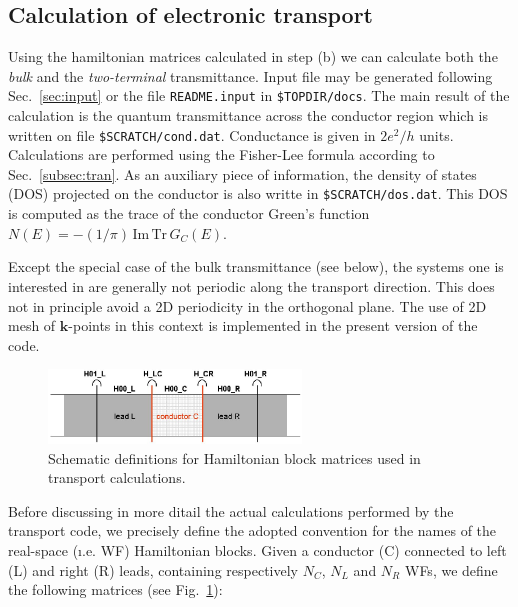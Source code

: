 
\subsection {Calculation of electronic transport}
\label{subsection:transport}

Using the hamiltonian matrices calculated in step (b) we can
calculate both the {\em bulk} and the {\em two-terminal} transmittance.
Input file may be generated following Sec.~\ref{sec:input}
or the file {\tt README.input} in {\tt \$TOPDIR/docs}. The main result of the 
calculation is the quantum transmittance across the conductor region
which is written on file {\tt \$SCRATCH/cond.dat}. Conductance is given
in $2e^2/h$ units. Calculations are performed using the Fisher-Lee formula
according to Sec.~\ref{subsec:tran}.
As an auxiliary piece of information, the density of states (DOS) projected on
the conductor is also writte in {\tt \$SCRATCH/dos.dat}.
This DOS is computed as the trace of the conductor Green's function
$ N(E) = -(1/\pi)\, \text{Im} \, \text{Tr}\, G_C(E)$.

Except the special case of the bulk transmittance (see below), the systems one is
interested in are generally not periodic along the transport direction. This does not
in principle avoid a 2D periodicity in the orthogonal plane. The use of 
2D mesh of $\mathbf{k}$-points in this context is implemented in the present 
version of the code.  \\

%
%
\begin{figure}
   \centering
   \includegraphics[clip,width=0.6\textwidth]{lcr}
   \caption{Schematic definitions for Hamiltonian block matrices used in 
	    transport calculations. \label{fig:matrix_naming}}
\end{figure}
%
%
\noindent 
Before discussing in more ditail the actual calculations performed by
the transport code, we precisely define the adopted convention for the
names of the real-space ({\i.e.} WF) Hamiltonian blocks.  
Given a conductor (C) connected to left (L) and right (R) leads, containing
respectively $N_C$, $N_L$ and $N_R$ WFs, 
we define the following matrices (see Fig.~\ref{fig:matrix_naming}): \\

